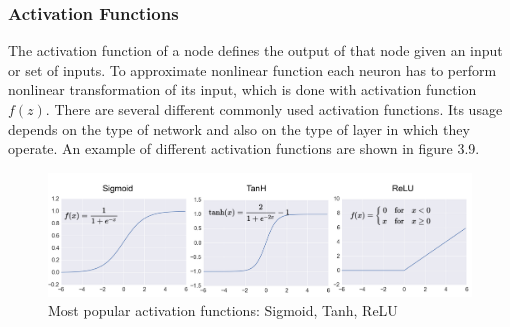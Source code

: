 \subsubsection*{Activation Functions}
The activation function of a node defines the output of that node given an input or set of inputs. To approximate nonlinear function each neuron has to perform nonlinear transformation of its input, which is done with activation function $f(z)$. There are several different commonly used activation functions. Its usage depends on the type of network and also on the type of layer in which they operate. An example of different activation functions are shown in figure 3.9.

\begin{figure}[h]
	\includegraphics[width=\textwidth]{Figures/Section3_activation.png} 
	\captionsetup{justification=centering}
	\caption{Most popular activation functions: Sigmoid, Tanh, ReLU}
	\label{fig:activation}
\end{figure}
